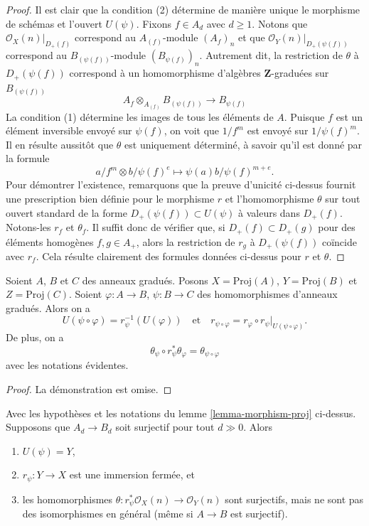 \begin{proof}
Il est clair que la condition (2) détermine de manière unique le morphisme de schémas
et l'ouvert $U(\psi)$. Fixons $f \in A_d$ avec $d \geq 1$.
Notons que
$\mathcal{O}_X(n)|_{D_{+}(f)}$ correspond au
$A_{(f)}$-module $(A_f)_n$ et que
$\mathcal{O}_Y(n)|_{D_{+}(\psi(f))}$ correspond au
$B_{(\psi(f))}$-module $(B_{\psi(f)})_n$. Autrement dit, la restriction de $\theta$
à $D_{+}(\psi(f))$ correspond à un homomorphisme d'algèbres
$\mathbf{Z}$-graduées sur $B_{(\psi(f))}$
$$
A_f \otimes_{A_{(f)}} B_{(\psi(f))}
\longrightarrow
B_{\psi(f)}
$$
La condition (1) détermine les images de tous les éléments de $A$.
Puisque $f$ est un élément inversible envoyé sur $\psi(f)$,
on voit que $1/f^m$ est envoyé sur $1/\psi(f)^m$. Il en résulte aussitôt
que $\theta$ est uniquement déterminé, à savoir qu'il est
donné par la formule
$$
a/f^m \otimes b/\psi(f)^e \longmapsto \psi(a)b/\psi(f)^{m + e}.
$$
Pour démontrer l'existence, remarquons que la preuve d'unicité ci-dessus fournit
une prescription bien définie pour le morphisme $r$ et l'homomorphisme $\theta$
sur tout ouvert standard de la forme
$D_{+}(\psi(f)) \subset U(\psi)$ à valeurs dans $D_{+}(f)$.
Notons-les $r_f$ et $\theta_f$.
Il suffit donc de vérifier que, si $D_{+}(f) \subset D_{+}(g)$
pour des éléments homogènes $f, g \in A_{+}$, alors la restriction de
$r_g$ à $D_{+}(\psi(f))$ coïncide avec $r_f$. Cela résulte clairement des
formules données ci-dessus pour $r$ et $\theta$.
\end{proof}

\begin{lemma}
\label{lemma-morphism-proj-transitive}
Soient $A$, $B$ et $C$ des anneaux gradués.
Posons $X = \text{Proj}(A)$, $Y = \text{Proj}(B)$ et $Z = \text{Proj}(C)$.
Soient $\varphi : A \to B$, $\psi : B \to C$ des homomorphismes d'anneaux gradués.
Alors on a
$$
U(\psi \circ \varphi) = r_\psi^{-1}(U(\varphi))
\quad
\text{et}
\quad
r_{\psi \circ \varphi}
=
r_\varphi \circ r_\psi|_{U(\psi \circ \varphi)}.
$$
De plus, on a
$$
\theta_\psi \circ r_\psi^*\theta_\varphi
=
\theta_{\psi \circ \varphi}
$$
avec les notations évidentes.
\end{lemma}

\begin{proof}
La démonstration est omise.
\end{proof}

\begin{lemma}
\label{lemma-surjective-graded-rings-map-proj}
Avec les hypothèses et les notations du lemme \ref{lemma-morphism-proj} ci-dessus.
Supposons que $A_d \to B_d$ soit surjectif pour tout $d \gg 0$. Alors
\begin{enumerate}
\item $U(\psi) = Y$,
\item $r_\psi : Y \to X$ est une immersion fermée, et
\item les homomorphismes $\theta : r_\psi^*\mathcal{O}_X(n) \to \mathcal{O}_Y(n)$
sont surjectifs, mais ne sont pas des isomorphismes en général (même si $A \to B$ est
surjectif).
\end{enumerate}
\end{lemma}

